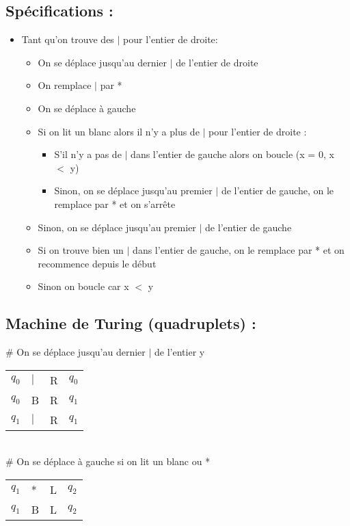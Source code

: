 \documentclass{article}
\begin{document}
\subsection*{Spécifications :}
\begin{itemize}
\item Tant qu'on trouve des $|$ pour l'entier de droite:
	\begin{itemize}
		\item On se déplace jusqu'au dernier $|$ de l'entier de droite
		\item On remplace $|$ par *
		\item On se déplace à gauche
		\item Si on lit un blanc alors il n'y a plus de $|$ pour l'entier de droite :
			\begin{itemize}
				\item S'il n'y a pas de $|$ dans l'entier de gauche alors on boucle (x = 0, x $<$ y)
				\item Sinon, on se déplace jusqu'au premier $|$ de l'entier de gauche, on le remplace par * et on s'arrête
			\end{itemize}
		\item Sinon, on se déplace jusqu'au premier $|$ de l'entier de gauche
		\item Si on trouve bien un $|$ dans l'entier de gauche, on le remplace par * et on recommence depuis le début
		\item Sinon on boucle car x $<$ y
	\end{itemize}
\end{itemize}

\subsection*{Machine de Turing (quadruplets) :}

\# On se déplace jusqu'au dernier $|$ de l'entier y

\begin{tabular}{llll}
$q_0$ & $|$ & R & $q_0$ \\
$q_0$ & B & R & $q_1$ \\
$q_1$ & $|$ & R & $q_1$ \\
\end{tabular}\\

\# On se déplace à gauche si on lit un blanc ou *

\begin{tabular}{llll}
$q_1$ & * & L & $q_2$ \\
$q_1$ & B & L & $q_2$
\end{tabular}\\
\end{document}
